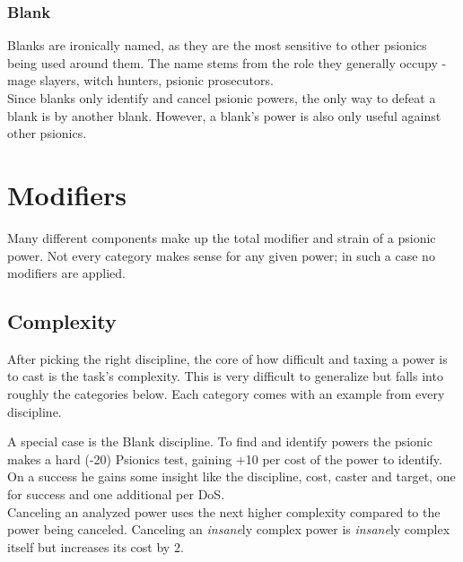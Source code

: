 \documentclass[12pt,a4paper,openany]{book}
\begin{document}
	\subsubsection*{Blank}
	Blanks are ironically named, as they are the most sensitive to other psionics being used around them. The name stems from the role they generally occupy - mage slayers, witch hunters, psionic prosecutors.\\
	Since blanks only identify and cancel psionic powers, the only way to defeat a blank is by another blank. However, a blank's power is also only useful against other psionics.
	\section{Modifiers}
	Many different components make up the total modifier and strain of a psionic power. Not every category makes sense for any given power; in such a case no modifiers are applied.
	\subsection{Complexity}
	After picking the right discipline, the core of how difficult and taxing a power is to cast is the task’s complexity. This is very difficult to generalize but falls into roughly the categories below. Each category comes with an example from every discipline.
	\begin{itemize}
	\end{itemize}
	A special case is the Blank discipline. To find and identify powers the psionic makes a hard (-20) Psionics test, gaining +10 per cost of the power to identify. On a success he gains some insight like the discipline, cost, caster and target, one for success and one additional per DoS.\\
	Canceling an analyzed power uses the next higher complexity compared to the power being canceled. Canceling an \emph{insane}ly complex power is \emph{insane}ly complex itself but increases its cost by 2.
\end{document}
